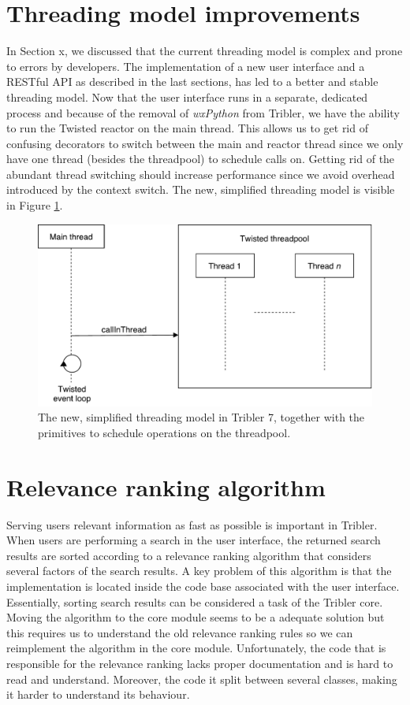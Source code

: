 \section{Threading model improvements}
In Section x, we discussed that the current threading model is complex and prone to errors by developers. The implementation of a new user interface and a RESTful API as described in the last sections, has led to a better and stable threading model. Now that the user interface runs in a separate, dedicated process and because of the removal of \emph{wxPython} from Tribler, we have the ability to run the Twisted reactor on the main thread. This allows us to get rid of confusing decorators to switch between the main and reactor thread since we only have one thread (besides the threadpool) to schedule calls on. Getting rid of the abundant thread switching should increase performance since we avoid overhead introduced by the context switch. The new, simplified threading model is visible in Figure \ref{fig:new-threading-model}.

\begin{figure}[h!]
	\centering
	\includegraphics[width=0.7\columnwidth]{images/improving_qa/new_threading_model_tribler}
	\caption{The new, simplified threading model in Tribler 7, together with the primitives to schedule operations on the threadpool.}
	\label{fig:new-threading-model}
\end{figure}

\section{Relevance ranking algorithm}
\label{sec:relevance-ranking-algorithm}
Serving users relevant information as fast as possible is important in Tribler. When users are performing a search in the user interface, the returned search results are sorted according to a relevance ranking algorithm that considers several factors of the search results. A key problem of this algorithm is that the implementation is located inside the code base associated with the user interface. Essentially, sorting search results can be considered a task of the Tribler core. Moving the algorithm to the core module seems to be a adequate solution but this requires us to understand the old relevance ranking rules so we can reimplement the algorithm in the core module. Unfortunately, the code that is responsible for the relevance ranking lacks proper documentation and is hard to read and understand. Moreover, the code it split between several classes, making it harder to understand its behaviour.

